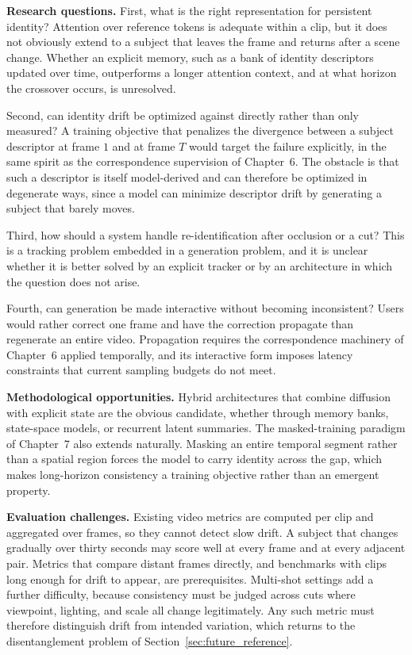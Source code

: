 \noindent \textbf{Research questions.}
First, what is the right representation for persistent identity? Attention over reference tokens is adequate within a clip, but it does not obviously extend to a subject that leaves the frame and returns after a scene change. Whether an explicit memory, such as a bank of identity descriptors updated over time, outperforms a longer attention context, and at what horizon the crossover occurs, is unresolved.

Second, can identity drift be optimized against directly rather than only measured? A training objective that penalizes the divergence between a subject descriptor at frame $1$ and at frame $T$ would target the failure explicitly, in the same spirit as the correspondence supervision of Chapter~6. The obstacle is that such a descriptor is itself model-derived and can therefore be optimized in degenerate ways, since a model can minimize descriptor drift by generating a subject that barely moves.

Third, how should a system handle re-identification after occlusion or a cut? This is a tracking problem embedded in a generation problem, and it is unclear whether it is better solved by an explicit tracker or by an architecture in which the question does not arise.

Fourth, can generation be made interactive without becoming inconsistent? Users would rather correct one frame and have the correction propagate than regenerate an entire video. Propagation requires the correspondence machinery of Chapter~6 applied temporally, and its interactive form imposes latency constraints that current sampling budgets do not meet.

\noindent \textbf{Methodological opportunities.}
Hybrid architectures that combine diffusion with explicit state are the obvious candidate, whether through memory banks, state-space models, or recurrent latent summaries. The masked-training paradigm of Chapter~7 also extends naturally. Masking an entire temporal segment rather than a spatial region forces the model to carry identity across the gap, which makes long-horizon consistency a training objective rather than an emergent property.

\noindent \textbf{Evaluation challenges.}
Existing video metrics are computed per clip and aggregated over frames, so they cannot detect slow drift. A subject that changes gradually over thirty seconds may score well at every frame and at every adjacent pair. Metrics that compare distant frames directly, and benchmarks with clips long enough for drift to appear, are prerequisites. Multi-shot settings add a further difficulty, because consistency must be judged across cuts where viewpoint, lighting, and scale all change legitimately. Any such metric must therefore distinguish drift from intended variation, which returns to the disentanglement problem of Section~\ref{sec:future_reference}.

